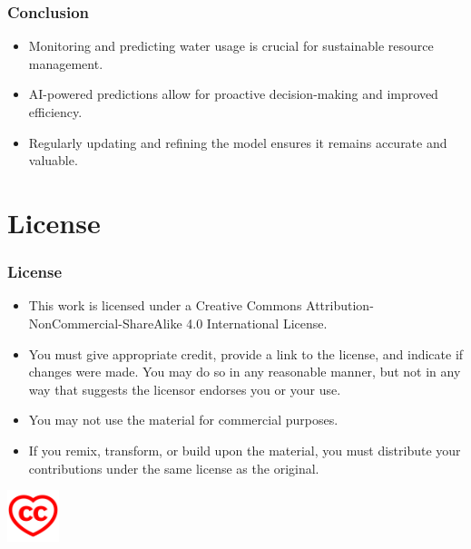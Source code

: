 \documentclass{beamer}
\begin{document}
\begin{frame}
\frametitle{Conclusion}
\begin{itemize}
    \item Monitoring and predicting water usage is crucial for sustainable resource management.
    \item AI-powered predictions allow for proactive decision-making and improved efficiency.
    \item Regularly updating and refining the model ensures it remains accurate and valuable.
\end{itemize}
\end{frame}

\section{License}

\begin{frame}
\frametitle{License}
\begin{itemize}
    \item This work is licensed under a Creative Commons Attribution-NonCommercial-ShareAlike 4.0 International License.
    \item You must give appropriate credit, provide a link to the license, and indicate if changes were made. You may do so in any reasonable manner, but not in any way that suggests the licensor endorses you or your use.
    \item You may not use the material for commercial purposes.
    \item If you remix, transform, or build upon the material, you must distribute your contributions under the same license as the original.
\end{itemize}
\includegraphics[width=1.5cm]{heart.red.png}
\end{frame}
\end{document}
